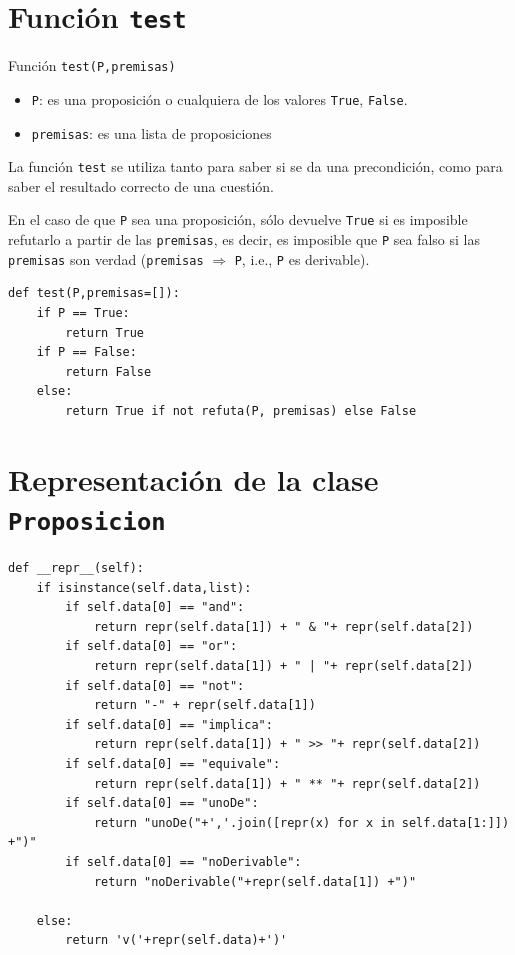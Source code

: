 \documentclass[10pt,a4paper]{report}
\begin{document}
\chapter{Función  \texttt{test}}
\label{sec:orga444d3a}

Función \texttt{test(P,premisas)}

\begin{itemize}
\item \texttt{P}: es una proposición o cualquiera de los valores \texttt{True}, \texttt{False}.
\item \texttt{premisas}: es una lista de proposiciones
\end{itemize}

La función \texttt{test} se utiliza tanto para saber si se da una precondición, como para saber el resultado correcto de una cuestión.

En el caso de que \texttt{P} sea una proposición, sólo devuelve \texttt{True} si es imposible refutarlo a partir de las \texttt{premisas}, es decir, es imposible que \texttt{P} sea falso si las \texttt{premisas} son verdad (\texttt{premisas} \(\Rightarrow\) \texttt{P}, i.e., \texttt{P} es derivable).

\begin{verbatim}
def test(P,premisas=[]):
    if P == True:
        return True
    if P == False:
        return False
    else:
        return True if not refuta(P, premisas) else False

\end{verbatim}
\chapter{Representación de la clase \texttt{Proposicion}}
\label{sec:org8ac50ee}

\begin{verbatim}
def __repr__(self):
    if isinstance(self.data,list):
        if self.data[0] == "and":
            return repr(self.data[1]) + " & "+ repr(self.data[2])
        if self.data[0] == "or":
            return repr(self.data[1]) + " | "+ repr(self.data[2])
        if self.data[0] == "not":
            return "-" + repr(self.data[1])
        if self.data[0] == "implica":
            return repr(self.data[1]) + " >> "+ repr(self.data[2])
        if self.data[0] == "equivale":
            return repr(self.data[1]) + " ** "+ repr(self.data[2])
        if self.data[0] == "unoDe":
            return "unoDe("+','.join([repr(x) for x in self.data[1:]]) +")"
        if self.data[0] == "noDerivable":
            return "noDerivable("+repr(self.data[1]) +")"            

    else:
        return 'v('+repr(self.data)+')'    
\end{verbatim}
\end{document}
